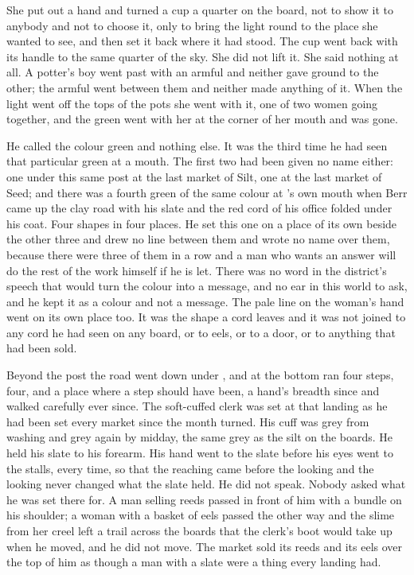 She put out a hand and turned a cup a quarter on the board, not to show it to anybody and not to choose it, only to bring the light round to the place she wanted to see, and then set it back where it had stood. The cup went back with its handle to the same quarter of the sky. She did not lift it. She said nothing at all. A potter's boy went past with an armful and neither gave ground to the other; the armful went between them and neither made anything of it. When the light went off the tops of the pots she went with it, one of two women going together, and the green went with her at the corner of her mouth and was gone.

He called the colour green and nothing else. It was the third time he had seen that particular green at a mouth. The first two had been given no name either: one under this same post at the last market of Silt, one at the last market of Seed; and there was a fourth green of the same colour at 's own mouth when Berr came up the clay road with his slate and the red cord of his office folded under his coat. Four shapes in four places. He set this one on a place of its own beside the other three and drew no line between them and wrote no name over them, because there were three of them in a row and a man who wants an answer will do the rest of the work himself if he is let. There was no word in the district's speech that would turn the colour into a message, and no ear in this world to ask, and he kept it as a colour and not a message. The pale line on the woman's hand went on its own place too. It was the shape a cord leaves and it was not joined to any cord he had seen on any board, or to eels, or to a door, or to anything that had been sold.

\scenebreak

Beyond the post the road went down under , and at the bottom  ran four steps, four, and a place where a step should have been, a hand's breadth  since  and walked carefully ever since. The soft-cuffed clerk was set at that landing as he had been set every market since the month turned. His cuff was grey from washing and grey again by midday, the same grey as the silt on the boards. He held his slate to his forearm. His hand went to the slate before his eyes went to the stalls, every time, so that the reaching came before the looking and the looking never changed what the slate held. He did not speak. Nobody asked what he was set there for. A man selling reeds passed in front of him with a bundle on his shoulder; a woman with a basket of eels passed the other way and the slime from her creel left a trail across the boards that the clerk's boot would take up when he moved, and he did not move. The market sold its reeds and its eels over the top of him as though a man with a slate were a thing every landing had.


